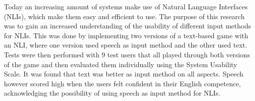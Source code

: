 Today an increasing amount of systems make use of Natural Language Interfaces (NLIs), which make them easy and efficient to use. The purpose of this research was to gain an increased understanding of the usability of different input methods for NLIs. This was done by implementing two versions of a text-based game with an NLI, where one version used speech as input method and the other used text. Tests were then performed with 9 test users that all played through both versions of the game and then evaluated them individually using the System Usability Scale. It was found that text was better as input method on all aspects. Speech however scored high when the users felt confident in their English competence, acknowledging the possibility of using speech as input method for NLIs.